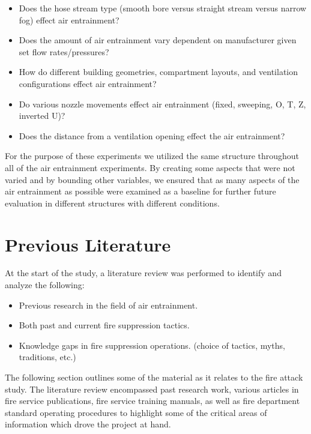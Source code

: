 \documentclass[12pt,oneside]{book}
\begin{document}
\begin{itemize}
	\item Does the hose stream type (smooth bore versus straight stream versus narrow fog) effect air entrainment?
	\item Does the amount of air entrainment vary dependent on manufacturer given set flow rates/pressures?
	\item How do different building geometries, compartment layouts, and ventilation configurations effect air entrainment?
	\item Do various nozzle movements effect air entrainment (fixed, sweeping, O, T, Z, inverted U)?
	\item Does the distance from a ventilation opening effect the air entrainment?

\end{itemize}

For the purpose of these experiments we utilized the same structure throughout all of the air entrainment experiments. By creating some aspects that were not varied and by bounding other variables, we ensured that as many aspects of the air entrainment as possible were examined as a baseline for further future evaluation in different structures with different conditions.

\clearpage

\chapter{Previous Literature}

At the start of the study, a literature review was performed to identify and analyze the following:

\begin{itemize}
	\item Previous research in the field of air entrainment.
	\item Both past and current fire suppression tactics.
	\item Knowledge gaps in fire suppression operations. (choice of tactics, myths, traditions, etc.) 
\end{itemize}

The following section outlines some of the material as it relates to the fire attack study. The literature review encompassed past research work, various articles in fire service publications, fire service training manuals, as well as fire department standard operating procedures to highlight some of the critical areas of information which drove the project at hand.
\end{document}
